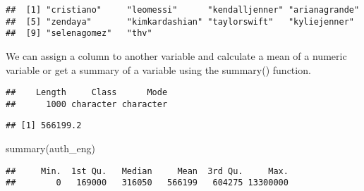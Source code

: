 \documentclass[
]{article}
\newenvironment{Shaded}{\begin{snugshade}}{\end{snugshade}}
\newcommand{\DecValTok}[1]{\textcolor[rgb]{0.00,0.00,0.81}{#1}}
\newcommand{\FunctionTok}[1]{\textcolor[rgb]{0.00,0.00,0.00}{#1}}
\newcommand{\NormalTok}[1]{#1}
\newcommand{\OtherTok}[1]{\textcolor[rgb]{0.56,0.35,0.01}{#1}}
\newcommand{\SpecialCharTok}[1]{\textcolor[rgb]{0.00,0.00,0.00}{#1}}
\begin{document}
\begin{Shaded}
\end{Shaded}

\begin{verbatim}
##  [1] "cristiano"     "leomessi"      "kendalljenner" "arianagrande" 
##  [5] "zendaya"       "kimkardashian" "taylorswift"   "kyliejenner"  
##  [9] "selenagomez"   "thv"
\end{verbatim}

We can assign a column to another variable and calculate a mean of a
numeric variable or get a summary of a variable using the summary()
function.

\begin{Shaded}
\end{Shaded}

\begin{verbatim}
##    Length     Class      Mode 
##      1000 character character
\end{verbatim}

\begin{Shaded}
\end{Shaded}

\begin{verbatim}
## [1] 566199.2
\end{verbatim}

\begin{Shaded}
\begin{Highlighting}[]
\FunctionTok{summary}\NormalTok{(auth\_eng)}
\end{Highlighting}
\end{Shaded}

\begin{verbatim}
##     Min.  1st Qu.   Median     Mean  3rd Qu.     Max. 
##        0   169000   316050   566199   604275 13300000
\end{verbatim}
\end{document}
